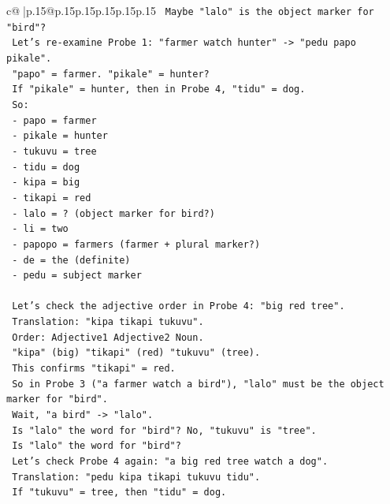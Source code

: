 \documentclass{article}
\begin{document}
{\begin{supertabular}{c@{$\;$}|p{.15\linewidth}@{}p{.15\linewidth}p{.15\linewidth}p{.15\linewidth}p{.15\linewidth}p{.15\linewidth}}
{{{\texttt{    Maybe "lalo" is the object marker for "bird"?} \\
\texttt{    Let's re{-}examine Probe 1: "farmer watch hunter" {-}> "pedu papo pikale".} \\
\texttt{    "papo" = farmer. "pikale" = hunter?} \\
\texttt{    If "pikale" = hunter, then in Probe 4, "tidu" = dog.} \\
\texttt{    So:} \\
\texttt{    {-} papo = farmer} \\
\texttt{    {-} pikale = hunter} \\
\texttt{    {-} tukuvu = tree} \\
\texttt{    {-} tidu = dog} \\
\texttt{    {-} kipa = big} \\
\texttt{    {-} tikapi = red} \\
\texttt{    {-} lalo = ? (object marker for bird?)} \\
\texttt{    {-} li = two} \\
\texttt{    {-} papopo = farmers (farmer + plural marker?)} \\
\texttt{    {-} de = the (definite)} \\
\texttt{    {-} pedu = subject marker} \\
\\ 
\texttt{    Let's check the adjective order in Probe 4: "big red tree".} \\
\texttt{    Translation: "kipa tikapi tukuvu".} \\
\texttt{    Order: Adjective1 Adjective2 Noun.} \\
\texttt{    "kipa" (big) "tikapi" (red) "tukuvu" (tree).} \\
\texttt{    This confirms "tikapi" = red.} \\
\texttt{    So in Probe 3 ("a farmer watch a bird"), "lalo" must be the object marker for "bird".} \\
\texttt{    Wait, "a bird" {-}> "lalo".} \\
\texttt{    Is "lalo" the word for "bird"? No, "tukuvu" is "tree".} \\
\texttt{    Is "lalo" the word for "bird"?} \\
\texttt{    Let's check Probe 4 again: "a big red tree watch a dog".} \\
\texttt{    Translation: "pedu kipa tikapi tukuvu tidu".} \\
\texttt{    If "tukuvu" = tree, then "tidu" = dog.} \\
}}}
\end{supertabular}}
\end{document}
